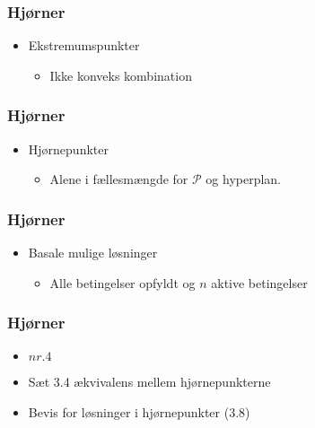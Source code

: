 %
\begin{frame}
\frametitle{Hjørner}
\begin{itemize}
\item Ekstremumspunkter
\begin{itemize}
\item Ikke konveks kombination
\end{itemize}
\end{itemize}
%

\end{frame}
%
%
\begin{frame}
\frametitle{Hjørner}
\begin{itemize}
\item Hjørnepunkter
\begin{itemize}
\item Alene i fællesmængde for $\mathcal{P}$ og hyperplan.
\end{itemize}
\end{itemize}
%

\end{frame}
%
%
\begin{frame}
\frametitle{Hjørner}
\begin{itemize}
\item Basale mulige løsninger
\begin{itemize}
\item Alle betingelser opfyldt og $n$ aktive betingelser
\end{itemize}
\end{itemize}
%

\end{frame}
%
%
%
\begin{frame}
\frametitle{Hjørner}
\begin{itemize}
\item \textbf{$nr. 4$}
\item Sæt 3.4 ækvivalens mellem hjørnepunkterne
\item Bevis for løsninger i hjørnepunkter (3.8)
\end{itemize}
\end{frame}